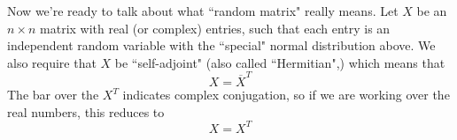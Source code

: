 Now we're ready to talk about what ``random matrix" really means. Let $X$ be an $n \times n$ matrix with real (or complex) entries, such that each entry is an independent random variable with the ``special" normal distribution above. We also require that $X$ be ``self-adjoint" (also called ``Hermitian",) which means that 
\[
X= \overline{X}^T
\]
The bar over the $X^T$ indicates complex conjugation, so if we are working over the real numbers, this reduces to 
\[
X=X^T
\]
